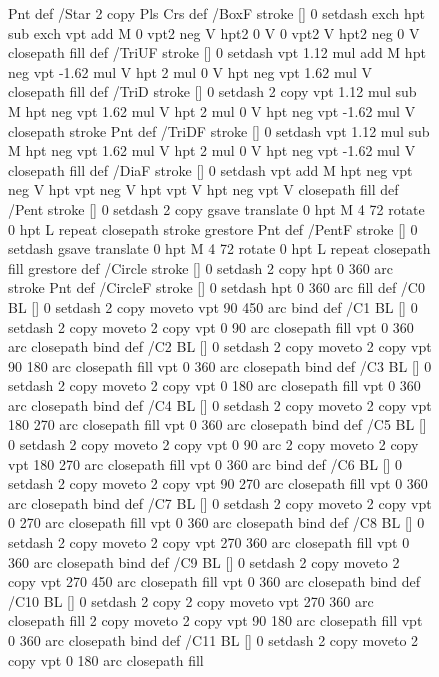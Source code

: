 \documentclass{LMCS}
\begin{document}
\begin{figure}[!tbp]
\begin{minipage}[b]{.47\linewidth}
{{{{  Pnt  } def
/Star { 2 copy Pls Crs } def
/BoxF { stroke [] 0 setdash exch hpt sub exch vpt add M
  0 vpt2 neg V  hpt2 0 V  0 vpt2 V
  hpt2 neg 0 V  closepath fill } def
/TriUF { stroke [] 0 setdash vpt 1.12 mul add M
  hpt neg vpt -1.62 mul V
  hpt 2 mul 0 V
  hpt neg vpt 1.62 mul V closepath fill } def
/TriD { stroke [] 0 setdash 2 copy vpt 1.12 mul sub M
  hpt neg vpt 1.62 mul V
  hpt 2 mul 0 V
  hpt neg vpt -1.62 mul V closepath stroke
  Pnt  } def
/TriDF { stroke [] 0 setdash vpt 1.12 mul sub M
  hpt neg vpt 1.62 mul V
  hpt 2 mul 0 V
  hpt neg vpt -1.62 mul V closepath fill} def
/DiaF { stroke [] 0 setdash vpt add M
  hpt neg vpt neg V hpt vpt neg V
  hpt vpt V hpt neg vpt V closepath fill } def
/Pent { stroke [] 0 setdash 2 copy gsave
  translate 0 hpt M 4 {72 rotate 0 hpt L} repeat
  closepath stroke grestore Pnt } def
/PentF { stroke [] 0 setdash gsave
  translate 0 hpt M 4 {72 rotate 0 hpt L} repeat
  closepath fill grestore } def
/Circle { stroke [] 0 setdash 2 copy
  hpt 0 360 arc stroke Pnt } def
/CircleF { stroke [] 0 setdash hpt 0 360 arc fill } def
/C0 { BL [] 0 setdash 2 copy moveto vpt 90 450  arc } bind def
/C1 { BL [] 0 setdash 2 copy        moveto
       2 copy  vpt 0 90 arc closepath fill
               vpt 0 360 arc closepath } bind def
/C2 { BL [] 0 setdash 2 copy moveto
       2 copy  vpt 90 180 arc closepath fill
               vpt 0 360 arc closepath } bind def
/C3 { BL [] 0 setdash 2 copy moveto
       2 copy  vpt 0 180 arc closepath fill
               vpt 0 360 arc closepath } bind def
/C4 { BL [] 0 setdash 2 copy moveto
       2 copy  vpt 180 270 arc closepath fill
               vpt 0 360 arc closepath } bind def
/C5 { BL [] 0 setdash 2 copy moveto
       2 copy  vpt 0 90 arc
       2 copy moveto
       2 copy  vpt 180 270 arc closepath fill
               vpt 0 360 arc } bind def
/C6 { BL [] 0 setdash 2 copy moveto
      2 copy  vpt 90 270 arc closepath fill
              vpt 0 360 arc closepath } bind def
/C7 { BL [] 0 setdash 2 copy moveto
      2 copy  vpt 0 270 arc closepath fill
              vpt 0 360 arc closepath } bind def
/C8 { BL [] 0 setdash 2 copy moveto
      2 copy vpt 270 360 arc closepath fill
              vpt 0 360 arc closepath } bind def
/C9 { BL [] 0 setdash 2 copy moveto
      2 copy  vpt 270 450 arc closepath fill
              vpt 0 360 arc closepath } bind def
/C10 { BL [] 0 setdash 2 copy 2 copy moveto vpt 270 360 arc closepath fill
       2 copy moveto
       2 copy vpt 90 180 arc closepath fill
               vpt 0 360 arc closepath } bind def
/C11 { BL [] 0 setdash 2 copy moveto
       2 copy  vpt 0 180 arc closepath fill
}}}}
\end{minipage}
\end{figure}
\end{document}
